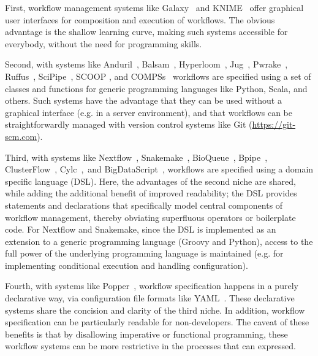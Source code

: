 \documentclass[10pt,a4paper,twocolumn]{article}
\let\plainurl\url
\renewcommand{\url}[1]{\protect\plainurl{#1}}
\begin{document}
First, workflow management systems like Galaxy~\parencite{Afgan2018} and KNIME~\parencite{wiswedel2007} offer graphical user interfaces for composition and execution of workflows.
The obvious advantage is the shallow learning curve, making such systems accessible for everybody, without the need for programming skills.

Second, with systems like Anduril~\parencite{Cervera2019}, Balsam~\parencite{papka2018}, Hyperloom~\parencite{cima2018hyperloom}, Jug~\parencite{Coelho_2017}, Pwrake~\parencite{Tanaka_2010}, Ruffus~\parencite{Goodstadt2010}, SciPipe~\parencite{Lampa2019}, SCOOP \parencite{SCOOP_XSEDE2014}, and COMPSs~\parencite{Lordan_2013} workflows are specified using a set of classes and functions for generic programming languages like Python, Scala, and others.
Such systems have the advantage that they can be used without a graphical interface (e.g. in a server environment), and that workflows can be straightforwardly managed with version control systems like Git (\url{https://git-scm.com}).

Third, with systems like Nextflow~\parencite{Di_Tommaso_2017}, Snakemake~\parencite{Koester2012}, BioQueue~\parencite{Yao2017}, Bpipe~\parencite{Sadedin2012}, ClusterFlow~\parencite{Ewels2016}, Cylc~\parencite{J_Oliver_2018},~and BigDataScript~\parencite{Cingolani_2014}, workflows are specified using a domain specific language (DSL).
Here, the advantages of the second niche are shared, while adding the additional benefit of improved readability; the DSL provides statements and declarations that specifically model central components of workflow management, thereby obviating superfluous operators or boilerplate code.
For Nextflow and Snakemake, since the DSL is implemented as an extension to a generic programming language (Groovy and Python), access to the full power of the underlying programming language is maintained (e.g. for implementing conditional execution and handling configuration).

Fourth, with systems like Popper~\parencite{Jimenez_2017}, workflow specification happens in a purely declarative way, via configuration file formats like YAML~\parencite{Evans2009-vp}.
These declarative systems share the concision and clarity of the third niche.
In addition, workflow specification can be particularly readable for non-developers.
The caveat of these benefits is that by disallowing imperative or functional programming, these workflow systems can be more restrictive in the processes that can expressed.
\end{document}
